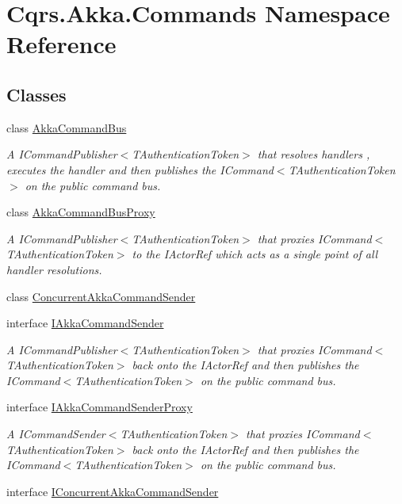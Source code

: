 \hypertarget{namespaceCqrs_1_1Akka_1_1Commands}{}\section{Cqrs.\+Akka.\+Commands Namespace Reference}
\label{namespaceCqrs_1_1Akka_1_1Commands}
\subsection*{Classes}
\begin{DoxyCompactItemize}
\item 
class \hyperlink{classCqrs_1_1Akka_1_1Commands_1_1AkkaCommandBus}{Akka\+Command\+Bus}
\begin{DoxyCompactList}\small\item\em A I\+Command\+Publisher$<$\+T\+Authentication\+Token$>$ that resolves handlers , executes the handler and then publishes the I\+Command$<$\+T\+Authentication\+Token$>$ on the public command bus. \end{DoxyCompactList}\item 
class \hyperlink{classCqrs_1_1Akka_1_1Commands_1_1AkkaCommandBusProxy}{Akka\+Command\+Bus\+Proxy}
\begin{DoxyCompactList}\small\item\em A I\+Command\+Publisher$<$\+T\+Authentication\+Token$>$ that proxies I\+Command$<$\+T\+Authentication\+Token$>$ to the I\+Actor\+Ref which acts as a single point of all handler resolutions. \end{DoxyCompactList}\item 
class \hyperlink{classCqrs_1_1Akka_1_1Commands_1_1ConcurrentAkkaCommandSender}{Concurrent\+Akka\+Command\+Sender}
\item 
interface \hyperlink{interfaceCqrs_1_1Akka_1_1Commands_1_1IAkkaCommandSender}{I\+Akka\+Command\+Sender}
\begin{DoxyCompactList}\small\item\em A I\+Command\+Publisher$<$\+T\+Authentication\+Token$>$ that proxies I\+Command$<$\+T\+Authentication\+Token$>$ back onto the I\+Actor\+Ref and then publishes the I\+Command$<$\+T\+Authentication\+Token$>$ on the public command bus. \end{DoxyCompactList}\item 
interface \hyperlink{interfaceCqrs_1_1Akka_1_1Commands_1_1IAkkaCommandSenderProxy}{I\+Akka\+Command\+Sender\+Proxy}
\begin{DoxyCompactList}\small\item\em A I\+Command\+Sender$<$\+T\+Authentication\+Token$>$ that proxies I\+Command$<$\+T\+Authentication\+Token$>$ back onto the I\+Actor\+Ref and then publishes the I\+Command$<$\+T\+Authentication\+Token$>$ on the public command bus. \end{DoxyCompactList}\item 
interface \hyperlink{interfaceCqrs_1_1Akka_1_1Commands_1_1IConcurrentAkkaCommandSender}{I\+Concurrent\+Akka\+Command\+Sender}
\end{DoxyCompactItemize}

